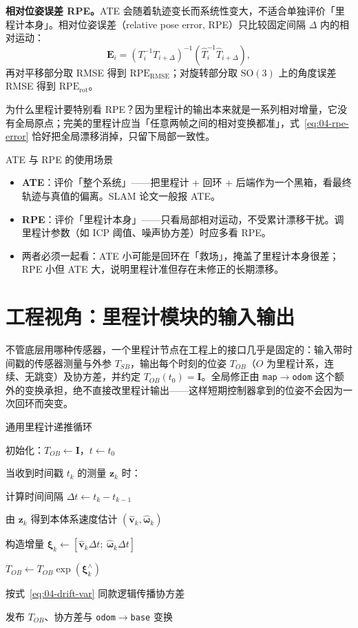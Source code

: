 \textbf{相对位姿误差 RPE。}ATE 会随着轨迹变长而系统性变大，不适合单独评价「里程计本身」。相对位姿误差（relative pose error, RPE）只比较固定间隔 $\Delta$ 内的相对运动：
\begin{equation}
  \bm{E}_i = \left(T_i^{-1}T_{i+\Delta}\right)^{-1}
  \left(\hat{T}_i^{-1}\hat{T}_{i+\Delta}\right),
  \label{eq:04-rpe-error}
\end{equation}
再对平移部分取 RMSE 得到 $\mathrm{RPE}_{\text{RMSE}}$；对旋转部分取 $\mathrm{SO}(3)$ 上的角度误差 RMSE 得到 $\mathrm{RPE}_{\text{rot}}$。

为什么里程计要特别看 RPE？因为里程计的输出本来就是一系列相对增量，它没有全局原点；完美的里程计应当「任意两帧之间的相对变换都准」，式~\eqref{eq:04-rpe-error} 恰好把全局漂移消掉，只留下局部一致性。

\begin{keybox}{ATE 与 RPE 的使用场景}
\begin{itemize}
  \item \textbf{ATE}：评价「整个系统」——把里程计 + 回环 + 后端作为一个黑箱，看最终轨迹与真值的偏离。SLAM 论文一般报 ATE。
  \item \textbf{RPE}：评价「里程计本身」——只看局部相对运动，不受累计漂移干扰。调里程计参数（如 ICP 阈值、噪声协方差）时应多看 RPE。
  \item 两者必须一起看：ATE 小可能是回环在「救场」，掩盖了里程计本身很差；RPE 小但 ATE 大，说明里程计准但存在未修正的长期漂移。
\end{itemize}
\end{keybox}

\section{工程视角：里程计模块的输入输出}\label{sec:04-engineering}

不管底层用哪种传感器，一个里程计节点在工程上的接口几乎是固定的：输入带时间戳的传感器测量与外参 $T_{SB}$，输出每个时刻的位姿 $T_{OB}$（$O$ 为里程计系，连续、无跳变）及协方差，并约定 $T_{OB}(t_0)=\bm{I}$。全局修正由 \texttt{map}$\to$\texttt{odom} 这个额外的变换承担，绝不直接改里程计输出——这样短期控制器拿到的位姿不会因为一次回环而突变。

\begin{pseudo}{通用里程计递推循环}
  \item 初始化：$T_{OB}\leftarrow\bm{I}$，$t\leftarrow t_0$
  \item 当收到时间戳 $t_k$ 的测量 $\bm{z}_k$ 时：
  \item \quad 计算时间间隔 $\Delta t\leftarrow t_k-t_{k-1}$
  \item \quad 由 $\bm{z}_k$ 得到本体系速度估计 $(\hat{\bm{v}}_k,\hat{\bm{\omega}}_k)$
  \item \quad 构造增量 $\bm{\xi}_k\leftarrow[\hat{\bm{v}}_k\Delta t;\ \hat{\bm{\omega}}_k\Delta t]$
  \item \quad $T_{OB}\leftarrow T_{OB}\exp(\bm{\xi}_k^{\wedge})$
  \item \quad 按式~\eqref{eq:04-drift-var} 同款逻辑传播协方差
  \item \quad 发布 $T_{OB}$、协方差与 \texttt{odom}$\to$\texttt{base} 变换
\end{pseudo}

